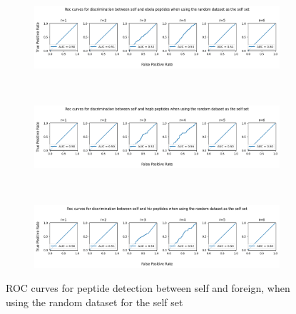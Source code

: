 \documentclass{article}
\begin{document}
\begin{figure}[ht]
    \begin{subfigure}[t]{\linewidth}
        \centering
        \includegraphics[width=\linewidth]{images/ebola_random.png}
        \label{fig:ebola_rnd}
    \end{subfigure}
    \\
    \begin{subfigure}[t]{\linewidth}
        \centering
        \includegraphics[width=\linewidth]{images/hepb_random.png}
        \label{fig:hepb_rnd}
    \end{subfigure}
        \\
    \begin{subfigure}[t]{\linewidth}
        \centering
        \includegraphics[width=\linewidth]{images/hiv_random.png}
        \label{fig:hiv_rnd}
    \end{subfigure}

    \caption{ROC curves for peptide detection between self and foreign, when using the random dataset for the self set}
    \label{fig:pept_rnd}
\end{figure}
\end{document}
